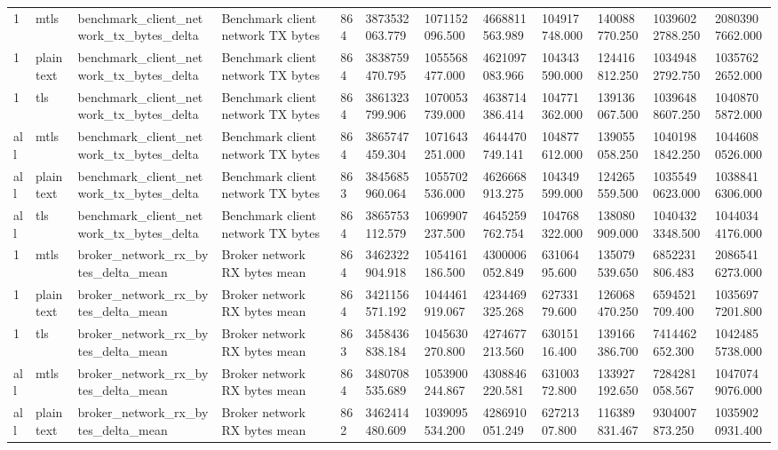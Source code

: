 \begin{longtable}{llllllllllll}
1 & mtls & benchmark\_client\_network\_tx\_bytes\_delta & Benchmark client network TX bytes & 864 & 3873532063.779 & 1071152096.500 & 4668811563.989 & 104917748.000 & 140088770.250 & 10396022788.250 & 20803907662.000 \\
1 & plaintext & benchmark\_client\_network\_tx\_bytes\_delta & Benchmark client network TX bytes & 864 & 3838759470.795 & 1055568477.000 & 4621097083.966 & 104343590.000 & 124416812.250 & 10349482792.750 & 10357622652.000 \\
1 & tls & benchmark\_client\_network\_tx\_bytes\_delta & Benchmark client network TX bytes & 864 & 3861323799.906 & 1070053739.000 & 4638714386.414 & 104771362.000 & 139136067.500 & 10396488607.250 & 10408705872.000 \\
all & mtls & benchmark\_client\_network\_tx\_bytes\_delta & Benchmark client network TX bytes & 864 & 3865747459.304 & 1071643251.000 & 4644470749.141 & 104877612.000 & 139055058.250 & 10401981842.250 & 10446080526.000 \\
all & plaintext & benchmark\_client\_network\_tx\_bytes\_delta & Benchmark client network TX bytes & 863 & 3845685960.064 & 1055702536.000 & 4626668913.275 & 104349599.000 & 124265559.500 & 10355490623.000 & 10388416306.000 \\
all & tls & benchmark\_client\_network\_tx\_bytes\_delta & Benchmark client network TX bytes & 864 & 3865753112.579 & 1069907237.500 & 4645259762.754 & 104768322.000 & 138080909.000 & 10404323348.500 & 10440344176.000 \\
1 & mtls & broker\_network\_rx\_bytes\_delta\_mean & Broker network RX bytes mean & 864 & 3462322904.918 & 1054161186.500 & 4300006052.849 & 63106495.600 & 135079539.650 & 6852231806.483 & 20865416273.000 \\
1 & plaintext & broker\_network\_rx\_bytes\_delta\_mean & Broker network RX bytes mean & 864 & 3421156571.192 & 1044461919.067 & 4234469325.268 & 62733179.600 & 126068470.250 & 6594521709.400 & 10356977201.800 \\
1 & tls & broker\_network\_rx\_bytes\_delta\_mean & Broker network RX bytes mean & 863 & 3458436838.184 & 1045630270.800 & 4274677213.560 & 63015116.400 & 139166386.700 & 7414462652.300 & 10424855738.000 \\
all & mtls & broker\_network\_rx\_bytes\_delta\_mean & Broker network RX bytes mean & 864 & 3480708535.689 & 1053900244.867 & 4308846220.581 & 63100372.800 & 133927192.650 & 7284281058.567 & 10470749076.000 \\
all & plaintext & broker\_network\_rx\_bytes\_delta\_mean & Broker network RX bytes mean & 862 & 3462414480.609 & 1039095534.200 & 4286910051.249 & 62721307.800 & 116389831.467 & 9304007873.250 & 10359020931.400 \\

\end{longtable}
